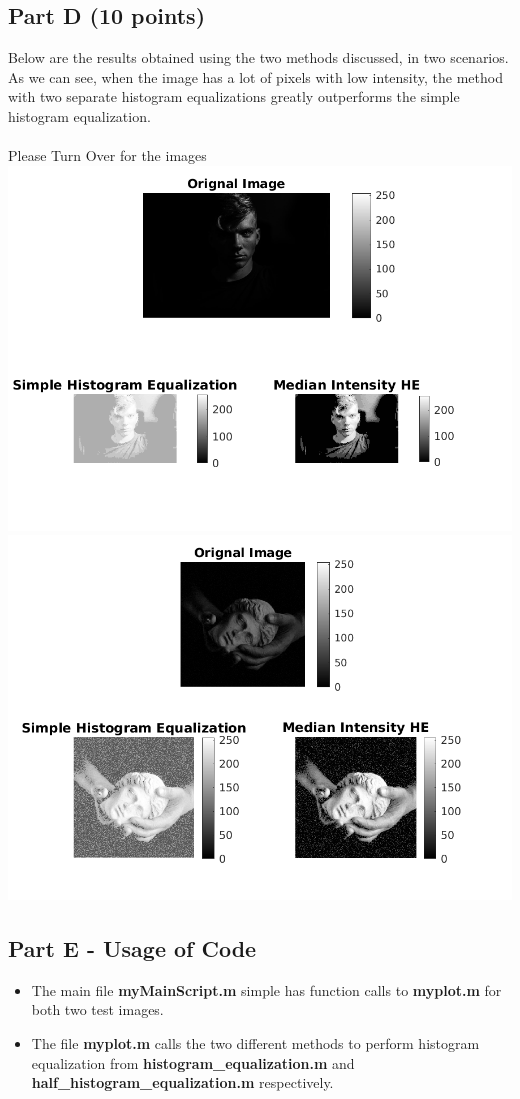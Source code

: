 \documentclass[12pt, a4paper]{article}
\begin{document}
\subsection*{Part D (10 points)}
\quad Below are the results obtained using the two methods discussed, in two scenarios. As we can see, when the image has a lot of pixels with low intensity, the method with two separate histogram equalizations greatly outperforms the simple histogram equalization. \\ \\ 
Please Turn Over for the images \\
\includegraphics[width=\textwidth]{man.png}
\includegraphics[width=\textwidth]{statue.png}

\subsection*{Part E - Usage of Code}
\begin{itemize}
	\item The main file \textbf{myMainScript.m} simple has function calls to \textbf{myplot.m} for both two test images.
	\item The file \textbf{myplot.m} calls the two different methods to perform histogram equalization from \textbf{histogram\_equalization.m} and \textbf{half\_histogram\_equalization.m} respectively.
\end{itemize}
\end{document}
